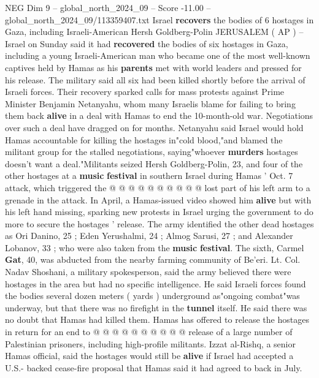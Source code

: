 \begin{textsample}{NEG Dim 9 – global\_north\_2024\_09 – Score -11.00 – global\_north\_2024\_09/113359407.txt}  \label{ex:f9_neg_011}
Israel \textbf{recovers} the bodies of 6 hostages in Gaza, including Israeli-American Hersh Goldberg-Polin JERUSALEM ( AP ) -- Israel on Sunday said it had \textbf{recovered} the bodies of six hostages in Gaza, including a young Israeli-American man who became one of the most well-known captives held by Hamas as his \textbf{parents} met with world leaders and pressed for his release.
The military said all six had been killed shortly before the arrival of Israeli forces.
Their recovery sparked calls for mass protests against Prime Minister Benjamin Netanyahu, whom many Israelis blame for failing to bring them back \textbf{alive} in a deal with Hamas to end the 10-month-old war.
Negotiations over such a deal have dragged on for months.
Netanyahu said Israel would hold Hamas accountable for killing the hostages in"cold blood,"and blamed the militant group for the stalled negotiations, saying"whoever \textbf{murders} hostages doesn't want a deal."Militants seized Hersh Goldberg-Polin, 23, and four of the other hostages at a \textbf{music} \textbf{festival} in southern Israel during Hamas ' Oct. 7 attack, which triggered the @ @ @ @ @ @ @ @ @ @ lost part of his left arm to a grenade in the attack.
In April, a Hamas-issued video showed him \textbf{alive} but with his left hand missing, sparking new protests in Israel urging the government to do more to secure the hostages ' release.
The army identified the other dead hostages as Ori Danino, 25 ; Eden Yerushalmi, 24 ; Almog Sarusi, 27 ; and Alexander Lobanov, 33 ; who were also taken from the \textbf{music} \textbf{festival}.
The sixth, Carmel \textbf{Gat}, 40, was abducted from the nearby farming community of Be'eri.
Lt.
Col.
Nadav Shoshani, a military spokesperson, said the army believed there were hostages in the area but had no specific intelligence.
He said Israeli forces found the bodies several dozen meters ( yards ) underground as"ongoing combat"was underway, but that there was no firefight in the \textbf{tunnel} itself.
He said there was no doubt that Hamas had killed them.
Hamas has offered to release the hostages in return for an end to @ @ @ @ @ @ @ @ @ @ release of a large number of Palestinian prisoners, including high-profile militants.
Izzat al-Rishq, a senior Hamas official, said the hostages would still be \textbf{alive} if Israel had accepted a U.S.- backed cease-fire proposal that Hamas said it had agreed to back in July.

\end{textsample}
